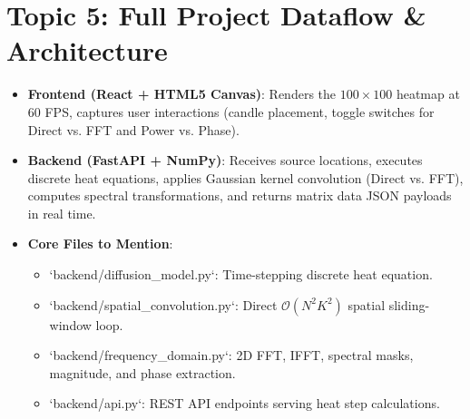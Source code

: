\documentclass[11pt]{book}
\begin{document}
\section{Topic 5: Full Project Dataflow \& Architecture}
\begin{itemize}
    \item \textbf{Frontend (React + HTML5 Canvas)}: Renders the $100 \times 100$ heatmap at 60 FPS, captures user interactions (candle placement, toggle switches for Direct vs. FFT and Power vs. Phase).
    \item \textbf{Backend (FastAPI + NumPy)}: Receives source locations, executes discrete heat equations, applies Gaussian kernel convolution (Direct vs. FFT), computes spectral transformations, and returns matrix data JSON payloads in real time.
    \item \textbf{Core Files to Mention}:
    \begin{itemize}
        \item `backend/diffusion\_model.py`: Time-stepping discrete heat equation.
        \item `backend/spatial\_convolution.py`: Direct $\mathcal{O}(N^2 K^2)$ spatial sliding-window loop.
        \item `backend/frequency\_domain.py`: 2D FFT, IFFT, spectral masks, magnitude, and phase extraction.
        \item `backend/api.py`: REST API endpoints serving heat step calculations.
    \end{itemize}
\end{itemize}
\end{document}
